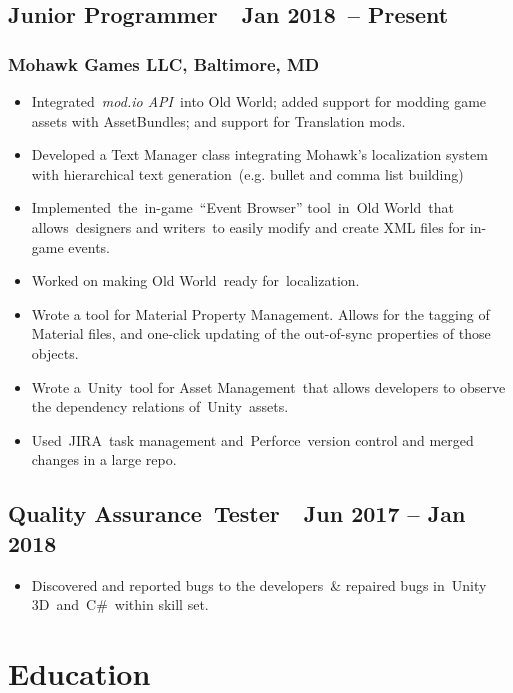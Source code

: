 \documentclass[letterpaper]{article}
\newcommand\textstyleHeadingivChar[1]{\textit{\textcolor[rgb]{0.6784314,0.30980393,0.05882353}{#1}}}
\newcommand\textstyleToolPrimaryChar[1]{\textcolor[rgb]{0.18039216,0.45490196,0.70980394}{#1}}
\newcommand\liststyleLFOi{%
\renewcommand\labelitemi{{}-}
\renewcommand\labelitemii{o}
\renewcommand\labelitemiii{${\blacksquare}$}
\renewcommand\labelitemiv{{\textbullet}}
}
\begin{document}
\subsection[Junior Programmer\ \ Jan 2018\ {}-- Present]{Junior Programmer\ \ Jan 2018\ {}-- Present}
\subsubsection{Mohawk Games LLC, Baltimore, MD}
\liststyleLFOi
\begin{itemize}
\item Integrated\ \textstyleHeadingivChar{mod.io API\ }into Old World; added support for modding game assets with
AssetBundles; and support for Translation mods.
\item Developed a Text Manager class integrating Mohawk's localization system with hierarchical text generation\ (e.g.
bullet and comma list building)
\item Implemented\ the\ in-game\ {}``Event Browser'' tool\ in\ Old World\ that allows\ designers and writers\ to easily
modify and create XML files for in-game events.
\item Worked on making Old World\ ready for\ localization.
\item Wrote a tool for Material Property Management. Allows for the tagging of Material files, and one-click updating of
the out-of-sync properties of those objects.
\item Wrote a\ \textstyleToolPrimaryChar{Unity}\ tool for Asset Management\ that allows developers to observe the
dependency relations of\ Unity\ assets.
\item Used\ \textstyleToolPrimaryChar{JIRA}\ task management and\ \textstyleToolPrimaryChar{Perforce}\ version control
and merged changes in a large repo.
\end{itemize}
\subsection[Quality Assurance\ Tester\ \ Jun 2017 {}-- Jan 2018]{Quality Assurance\ Tester\ \ Jun 2017 -- Jan 2018}
\liststyleLFOi
\begin{itemize}
\item Discovered and reported bugs to the developers\ \& repaired bugs in\ \textstyleToolPrimaryChar{Unity
3D}\ and\ \textstyleToolPrimaryChar{C\#}\ within skill set.
\end{itemize}
\section{Education}
\end{document}
